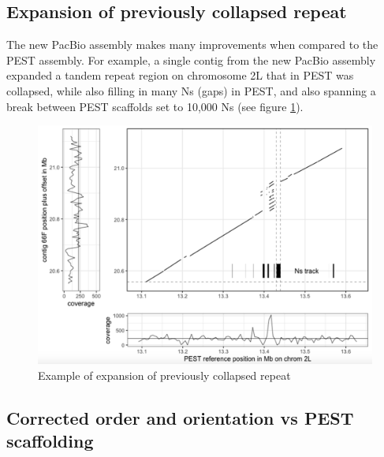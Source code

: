 \subsection{Expansion of previously collapsed repeat}

\par{
The new PacBio assembly makes many improvements when compared to the PEST assembly. For example, a single contig from the new PacBio assembly expanded a tandem repeat region on chromosome 2L that in PEST was collapsed, while also filling in many Ns (gaps) in PEST, and also spanning a break between PEST scaffolds set to 10,000 Ns (see figure \ref{figure:repeat}).
}

\begin{figure}[htbp!]

\caption{Example of expansion of previously collapsed repeat}
\label{figure:repeat}
\begin{centering}
\includegraphics[width=1.0\textwidth]{repeatexpansion.png}
\end{centering}
\end{figure}

\subsection{Corrected order and orientation vs PEST scaffolding}

